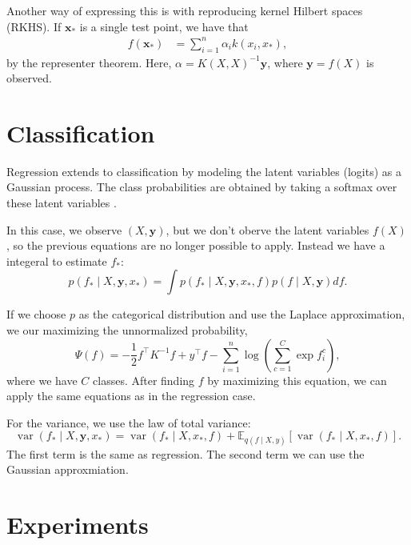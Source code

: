 \documentclass[letterpaper]{article}
\begin{document}
Another way of expressing this is with reproducing kernel Hilbert spaces
(RKHS). If $\mathbf{x}_*$ is a single test point, we have that
\begin{align*}
  f\left(\mathbf{x}_*\right)
  &= \sum_{i=1}^n\alpha_ik(x_i, x_*),
\end{align*}
by the representer theorem. Here, $\alpha = K(X,X)^{-1}\mathbf{y}$, where
$\mathbf{y} = f(X)$ is observed.

\section*{Classification}

Regression extends to classification by modeling the latent variables (logits)
as a Gaussian process. The class probabilities are obtained by taking a softmax
over these latent variables \citep{gpbook}.

In this case, we observe $(X, \mathbf{y})$, but we don't oberve the latent
variables $f(X)$, so the previous equations are no longer possible to
apply. Instead we have a integeral to estimate $f_*$:
\begin{equation*}
  p\left(f_* \mid X, \mathbf{y}, x_*\right) =
    \int p(f_*\mid X, \mathbf{y}, x_*, f) p\left(f \mid X, \mathbf{y}\right) df.
  \end{equation*}

  If we choose $p$ as the categorical distribution and use the Laplace
  approximation, we our maximizing the unnormalized probability,
  \begin{equation}
    \Psi(f) = -\frac{1}{2}f^\intercal K^{-1} f + y^\intercal f
     - \sum_{i=1}^n\log\left(\sum_{c=1}^C \exp f_i^c\right),
   \end{equation}
   where we have $C$ classes. After finding $f$ by maximizing this equation, we
   can apply the same equations as in the regression case.

   For the variance, we use the law of total variance:
   \begin{equation}
     \operatorname{var}(f_* \mid X, \mathbf{y}, x_*) =
     \operatorname{var}(f_* \mid X, x_*, f)
     +
     \mathbb{E}_{q(f \mid X, y)}\left[
       \operatorname{var}(f_* \mid X, x_*, f)
     \right].
   \end{equation}
   The first term is the same as regression. The second term we can use the
   Gaussian approxmiation.

   \section*{Experiments}
\end{document}
